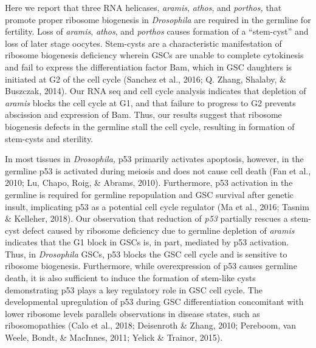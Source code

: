 \documentclass[12pt,oneside]{reedthesis}
\begin{document}
Here we report that three RNA helicases, \emph{aramis}, \emph{athos}, and \emph{porthos,} that promote proper ribosome biogenesis in \emph{Drosophila} are required in the germline for fertility. Loss of \emph{aramis}, \emph{athos}, and \emph{porthos} causes formation of a ``stem-cyst'' and loss of later stage oocytes. Stem-cysts are a characteristic manifestation of ribosome biogenesis deficiency wherein GSCs are unable to complete cytokinesis and fail to express the differentiation factor Bam, which in GSC daughters is initiated at G2 of the cell cycle (Sanchez et al., 2016; Q. Zhang, Shalaby, \& Buszczak, 2014). Our RNA seq and cell cycle analysis indicates that depletion of \emph{aramis} blocks the cell cycle at G1, and that failure to progress to G2 prevents abscission and expression of Bam. Thus, our results suggest that ribosome biogenesis defects in the germline stall the cell cycle, resulting in formation of stem-cysts and sterility.

In most tissues in \emph{Drosophila,} p53 primarily activates apoptosis, however, in the germline p53 is activated during meiosis and does not cause cell death (Fan et al., 2010; Lu, Chapo, Roig, \& Abrams, 2010). Furthermore, p53 activation in the germline is required for germline repopulation and GSC survival after genetic insult, implicating p53 as a potential cell cycle regulator (Ma et al., 2016; Tasnim \& Kelleher, 2018). Our observation that reduction of \emph{p53} partially rescues a stem-cyst defect caused by ribosome deficiency due to germline depletion of \emph{aramis} indicates that the G1 block in GSCs is, in part, mediated by p53 activation. Thus, in \emph{Drosophila} GSCs, p53 blocks the GSC cell cycle and is sensitive to ribosome biogenesis. Furthermore, while overexpression of p53 causes germline death, it is also sufficient to induce the formation of stem-like cysts demonstrating p53 plays a key regulatory role in GSC cell cycle. The developmental upregulation of p53 during GSC differentiation concomitant with lower ribosome levels parallels observations in disease states, such as ribosomopathies (Calo et al., 2018; Deisenroth \& Zhang, 2010; Pereboom, van Weele, Bondt, \& MacInnes, 2011; Yelick \& Trainor, 2015).
\end{document}
